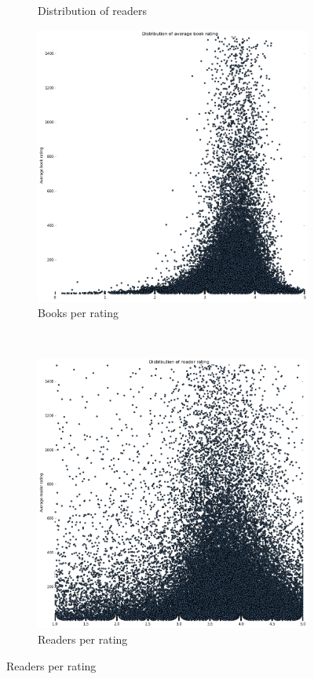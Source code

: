 \documentclass[11pt]{article}
\begin{document}
\begin{figure}
\begin{subfigure}[b]{0.5\textwidth}
                \caption{Distribution of readers}
        \end{subfigure}

        \begin{subfigure}[b]{0.5\textwidth}
                \includegraphics[width=\textwidth]{images/book_scatter_1500}
                \caption{Books per rating}
        \end{subfigure}%
        ~ %
        \begin{subfigure}[b]{0.5\textwidth}
                \includegraphics[width=\textwidth]{images/user_scatter_1500}
                \caption{Readers per rating}
        \end{subfigure}


\end{figure}
\end{document}
